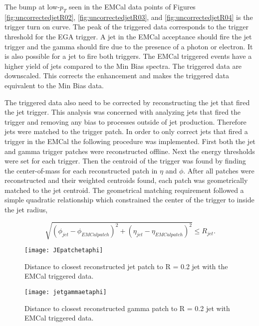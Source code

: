 The bump at low-$p_{T}$ seen in the EMCal data points of Figures \ref{fig:uncorrectedjetR02}, \ref{fig:uncorrectedjetR03}, and \ref{fig:uncorrectedjetR04} is the trigger turn on curve. The peak of the triggered data corresponds to the trigger threshold for the EGA trigger.  A jet in the EMCal acceptance should fire the jet trigger and the gamma should fire due to the presence of a photon or electron. It is also possible for a jet to fire both triggers.  The EMCal triggered events have a higher yield of jets compared to the Min Bias spectra. The triggered data are downscaled.  This corrects the enhancement and makes the triggered data equivalent to the Min Bias data.  

The triggered data also need to be corrected by reconstructing the jet that fired the jet trigger.  This analysis was concerned with analyzing jets that fired the trigger and removing any bias to processes outside of jet production. Therefore jets were matched to the trigger patch.  In order to only correct jets that fired a trigger in the EMCal the following procedure was implemented.  First both the jet and gamma trigger patches were reconstructed offline.  Next the energy thresholds were set for each trigger.  Then the centroid of the trigger was found by finding the center-of-mass for each reconstructed patch in $\eta$ and $\phi$.  After all patches were reconstructed and their weighted centroids found, each patch was geometrically matched to the jet centroid.  The geometrical matching requirement followed a simple quadratic relationship which constrained the center of the trigger to inside the jet radius,

\begin{equation}
\sqrt{ ( \phi_{jet} - \phi_{EMCal patch} )^{2} + ( \eta_{jet} - \eta_{EMCal patch} )^{2}}  \leq R_{jet} .
\label{eq:triggermatch}
\end{equation}

\begin{figure}[b!]
\texttt{[image: JEpatchetaphi]}
\centering
\caption{Distance to closest reconstructed jet patch to R = 0.2 jet with the EMCal triggered data.}
\label{fig:DisJetEJE}
\end{figure}

\begin{figure}[t!]
\texttt{[image: jetgammaetaphi]}
\centering
\caption{Distance to closest reconstructed gamma patch to R = 0.2 jet with EMCal triggered data.}
\label{fig:DisJetEGA}
\end{figure}

